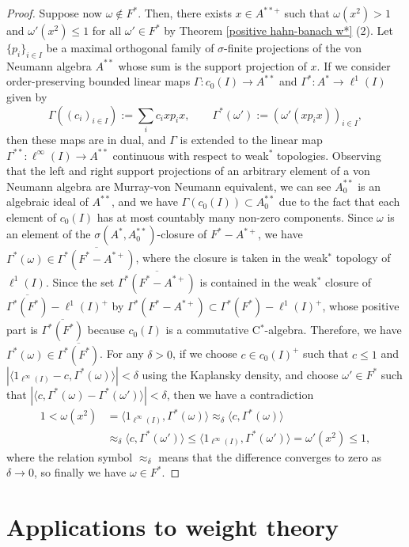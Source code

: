\documentclass[a4paper]{amsart}
\theoremstyle{plain}
\theoremstyle{definition}
\begin{document}
\begin{proof}
Suppose now $\omega\notin F^*$.
Then, there exists $x\in A^{**+}$ such that $\omega(x^2)>1$ and $\omega'(x^2)\le1$ for all $\omega'\in F^*$ by Theorem \ref{positive hahn-banach w*} (2).
Let $\{p_i\}_{i\in I}$ be a maximal orthogonal family of $\sigma$-finite projections of the von Neumann algebra $A^{**}$ whose sum is the support projection of $x$.
If we consider order-preserving bounded linear maps $\Gamma:c_0(I)\to A^{**}$ and $\Gamma^*:A^*\to\ell^1(I)$ given by
\[\Gamma((c_i)_{i\in I}):=\sum_ic_ixp_ix,\qquad
\Gamma^*(\omega'):=(\omega'(xp_ix))_{i\in I},\]
then these maps are in dual, and $\Gamma$ is extended to the linear map $\Gamma^{**}:\ell^\infty(I)\to A^{**}$ continuous with respect to weak$^*$ topologies.
Observing that the left and right support projections of an arbitrary element of a von Neumann algebra are Murray-von Neumann equivalent, we can see $A_0^{**}$ is an algebraic ideal of $A^{**}$, and we have $\Gamma(c_0(I))\subset A_0^{**}$ due to the fact that each element of $c_0(I)$ has at most countably many non-zero components.
Since $\omega$ is an element of the $\sigma(A^*,A_0^{**})$-closure of $F^*-A^{*+}$, we have $\Gamma^*(\omega)\in \overline{\Gamma^*(F^*-A^{*+})}$, where the closure is taken in the weak$^*$ topology of $\ell^1(I)$.
Since the set $\overline{\Gamma^*(F^*-A^{*+})}$ is contained in the weak$^*$ closure of $\overline{\Gamma^*(F^*)}-\ell^1(I)^+$ by $\Gamma^*(F^*-A^{*+})\subset\Gamma^*(F^*)-\ell^1(I)^+$, whose positive part is $\overline{\Gamma^*(F^*)}$ because $c_0(I)$ is a commutative C$^*$-algebra.
Therefore, we have $\Gamma^*(\omega)\in\overline{\Gamma^*(F^*)}$.
For any $\delta>0$, if we choose $c\in c_0(I)^+$ such that $c\le1$ and $|\langle1_{\ell^\infty(I)}-c,\Gamma^*(\omega)\rangle|<\delta$ using the Kaplansky density, and choose $\omega'\in F^*$ such that $|\langle c,\Gamma^*(\omega)-\Gamma^*(\omega')\rangle|<\delta$, then we have a contradiction
\begin{align*}
1<\omega(x^2)&=\langle1_{\ell^\infty(I)},\Gamma^*(\omega)\rangle\approx_\delta\langle c,\Gamma^*(\omega)\rangle\\
&\approx_\delta\langle c,\Gamma^*(\omega')\rangle\le\langle1_{\ell^\infty(I)},\Gamma^*(\omega')\rangle=\omega'(x^2)\le1,
\end{align*}
where the relation symbol $\approx_\delta$ means that the difference converges to zero as $\delta\to0$, so finally we have $\omega\in F^*$.
\end{proof}




\section{Applications to weight theory}
\end{document}
